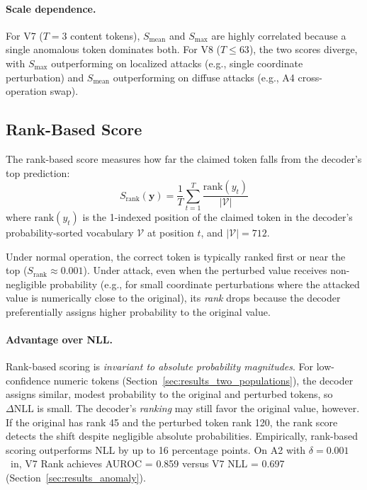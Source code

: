 \paragraph{Scale dependence.}
For V7 ($T = 3$ content tokens), $S_{\text{mean}}$ and $S_{\max}$ are highly correlated because a single anomalous token dominates both.
For V8 ($T \leq 63$), the two scores diverge, with $S_{\max}$ outperforming on localized attacks (e.g., single coordinate perturbation) and $S_{\text{mean}}$ outperforming on diffuse attacks (e.g., A4 cross-operation swap).

\subsection{Rank-Based Score}
\label{sec:rank_score}

The rank-based score measures how far the claimed token falls from the decoder's top prediction:
\begin{equation}
    S_{\text{rank}}(\mathbf{y}) = \frac{1}{T} \sum_{t=1}^{T} \frac{\text{rank}(y_t)}{|\mathcal{V}|}
    \label{eq:s_rank}
\end{equation}
where $\text{rank}(y_t)$ is the 1-indexed position of the claimed token in the decoder's probability-sorted vocabulary $\mathcal{V}$ at position $t$, and $|\mathcal{V}| = 712$.

Under normal operation, the correct token is typically ranked first or near the top ($S_{\text{rank}} \approx 0.001$).
Under attack, even when the perturbed value receives non-negligible probability (e.g., for small coordinate perturbations where the attacked value is numerically close to the original), its \emph{rank} drops because the decoder preferentially assigns higher probability to the original value.

\paragraph{Advantage over NLL.}
Rank-based scoring is \emph{invariant to absolute probability magnitudes}.
For low-confidence numeric tokens (Section~\ref{sec:results_two_populations}), the decoder assigns similar, modest probability to the original and perturbed tokens, so $\Delta\text{NLL}$ is small.
The decoder's \emph{ranking} may still favor the original value, however.
If the original has rank 45 and the perturbed token rank 120, the rank score detects the shift despite negligible absolute probabilities.
Empirically, rank-based scoring outperforms NLL by up to 16 percentage points.
On A2 with $\delta = 0.001$~in, V7 Rank achieves AUROC = 0.859 versus V7 NLL = 0.697 (Section~\ref{sec:results_anomaly}).

